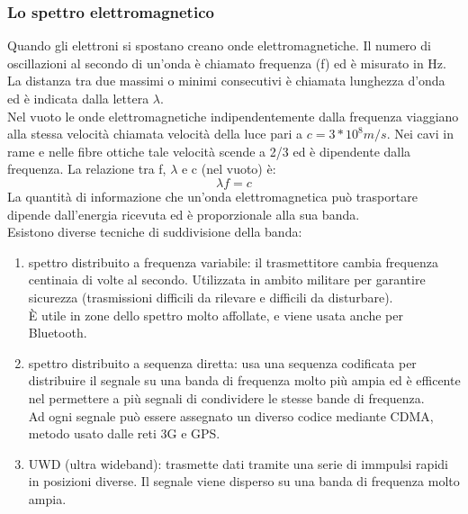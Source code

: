 \documentclass{article}
\begin{document}
		\subsubsection{Lo spettro elettromagnetico}
		Quando gli elettroni si spostano creano onde elettromagnetiche. Il numero di oscillazioni al secondo di un'onda è chiamato frequenza (f) ed è misurato in Hz. La distanza tra due massimi o minimi consecutivi è chiamata lunghezza d'onda ed è indicata dalla lettera $\lambda$.\\
		Nel vuoto le onde elettromagnetiche indipendentemente dalla frequenza viaggiano alla stessa velocità chiamata velocità della luce pari a $c = 3*10^{8} m/s$. Nei cavi in rame e nelle fibre ottiche tale velocità scende a 2/3 ed è dipendente dalla frequenza.
		La relazione tra f, $\lambda$ e c (nel vuoto) è:
		\begin{equation}
			\lambda f = c	
		\end{equation}				
		La quantità di informazione che un'onda elettromagnetica può trasportare dipende dall'energia ricevuta ed è proporzionale alla sua banda. \\
		Esistono diverse tecniche di suddivisione della banda:
		\begin{enumerate}
		\item spettro distribuito a frequenza variabile: il trasmettitore cambia frequenza centinaia di volte al secondo. Utilizzata in ambito militare per garantire sicurezza (trasmissioni difficili da rilevare e difficili da disturbare).\\
		È utile in zone dello spettro molto affollate, e viene usata anche per Bluetooth. 
		\item spettro distribuito a sequenza diretta: usa una sequenza codificata per distribuire il segnale su una banda di frequenza molto più ampia ed è efficente nel permettere a più segnali di condividere le stesse bande di frequenza. \\
		Ad ogni segnale può essere assegnato un diverso codice mediante CDMA, metodo usato dalle reti 3G  e GPS. 
		\item UWD (ultra wideband): trasmette dati tramite una serie di immpulsi rapidi in posizioni diverse. Il segnale viene disperso su una banda di frequenza molto ampia. 
		\end{enumerate}
\end{document}
